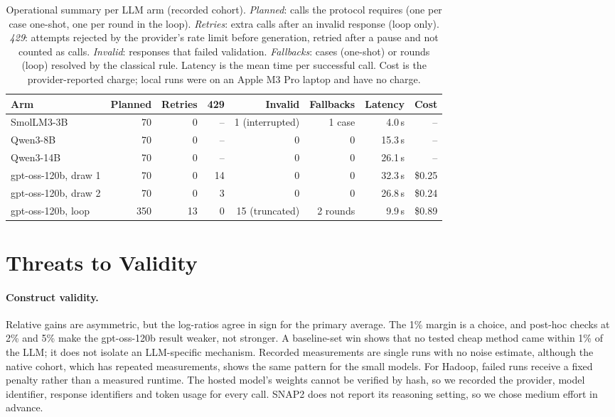 \begin{table}[t]
\centering
\caption{Operational summary per LLM arm (recorded cohort). \emph{Planned}: calls the protocol requires (one per case one-shot, one per round in the loop). \emph{Retries}: extra calls after an invalid response (loop only). \emph{429}: attempts rejected by the provider's rate limit before generation, retried after a pause and not counted as calls. \emph{Invalid}: responses that failed validation. \emph{Fallbacks}: cases (one-shot) or rounds (loop) resolved by the classical rule. Latency is the mean time per successful call. Cost is the provider-reported charge; local runs were on an Apple M3 Pro laptop and have no charge.}
\label{tab:ops}
\small
\setlength{\tabcolsep}{4pt}
\begin{tabular}{lrrrrrrr}
\toprule
Arm & Planned & Retries & 429 & Invalid & Fallbacks & Latency & Cost \\
\midrule
SmolLM3-3B & 70 & 0 & -- & 1 (interrupted) & 1 case & 4.0\,s & -- \\
Qwen3-8B & 70 & 0 & -- & 0 & 0 & 15.3\,s & -- \\
Qwen3-14B & 70 & 0 & -- & 0 & 0 & 26.1\,s & -- \\
gpt-oss-120b, draw 1 & 70 & 0 & 14 & 0 & 0 & 32.3\,s & \$0.25 \\
gpt-oss-120b, draw 2 & 70 & 0 & 3 & 0 & 0 & 26.8\,s & \$0.24 \\
gpt-oss-120b, loop & 350 & 13 & 0 & 15 (truncated) & 2 rounds & 9.9\,s & \$0.89 \\
\bottomrule
\end{tabular}
\end{table}

\section{Threats to Validity}

\paragraph{Construct validity.} Relative gains are asymmetric, but the log-ratios agree in sign for the primary average. The 1\% margin is a choice, and post-hoc checks at 2\% and 5\% make the gpt-oss-120b result weaker, not stronger. A baseline-set win shows that no tested cheap method came within 1\% of the LLM; it does not isolate an LLM-specific mechanism. Recorded measurements are single runs with no noise estimate, although the native cohort, which has repeated measurements, shows the same pattern for the small models. For Hadoop, failed runs receive a fixed penalty rather than a measured runtime. The hosted model's weights cannot be verified by hash, so we recorded the provider, model identifier, response identifiers and token usage for every call. SNAP2 does not report its reasoning setting, so we chose medium effort in advance.

